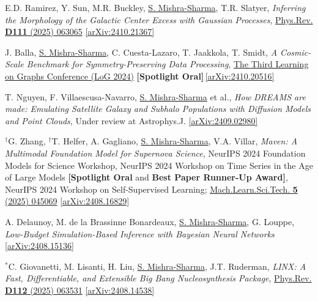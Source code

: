 \documentclass[letterpaper,11pt]{article}
\newenvironment{packed_enumerate}[1][]{
\begin{etaremune}[#1]
  \setlength{\itemsep}{4.0pt}
  \setlength{\parskip}{0pt}
  \setlength{\parsep}{0pt}}{\end{etaremune}
}
\begin{document}
\begin{packed_enumerate}[start=63]
\item E.D. Ramirez, Y. Sun, M.R. Buckley, \underline{S. Mishra-Sharma}, T.R. Slatyer, \emph{Inferring the Morphology of the Galactic Center Excess with Gaussian Processes}, \href{https://journals.aps.org/prd/abstract/10.1103/PhysRevD.111.063065}{Phys.Rev. \textbf{D111} (2025) 063065} \href{https://arxiv.org/abs/2410.21367}{[arXiv:2410.21367]}
\item J. Balla, \underline{S. Mishra-Sharma}, C. Cuesta-Lazaro, T. Jaakkola, T. Smidt, \emph{A Cosmic-Scale Benchmark for Symmetry-Preserving Data Processing}, \href{https://openreview.net/forum?id=t8yFkSAsLq}{The Third Learning on Graphs Conference (LoG 2024)}  {\textbf{[Spotlight Oral]}}\,\href{https://arxiv.org/abs/2410.20516}{[arXiv:2410.20516]}
\item T. Nguyen, F. Villaescusa-Navarro, \underline{S. Mishra-Sharma} et al., \emph{How DREAMS are made: Emulating Satellite Galaxy and Subhalo Populations with Diffusion Models and Point Clouds}, Under review at Astrophys.J. \href{https://arxiv.org/abs/2409.02980}{[arXiv:2409.02980]}
\item $^{\dagger}$G. Zhang, $^{\dagger}$T. Helfer, A. Gagliano, \underline{S. Mishra-Sharma}, V.A. Villar, \emph{Maven: A Multimodal Foundation Model for Supernova Science}, NeurIPS 2024 Foundation Models for Science Workshop, NeurIPS 2024 Workshop on Time Series in the Age of Large Models {\textbf{[Spotlight Oral} and \textbf{Best Paper Runner-Up Award]}}, NeurIPS 2024 Workshop on Self-Supervised Learning; \href{https://iopscience.iop.org/article/10.1088/2632-2153/ad990d}{Mach.Learn.Sci.Tech. \textbf{5} (2025) 045069} \href{https://arxiv.org/abs/2408.16829}{[arXiv:2408.16829]}
\item A. Delaunoy, M. de la Brassinne Bonardeaux, \underline{S. Mishra-Sharma}, G. Louppe, \emph{Low-Budget Simulation-Based Inference with Bayesian Neural Networks} \href{https://arxiv.org/abs/2408.15136}{[arXiv:2408.15136]}
\item $^*$C. Giovanetti, M. Lisanti, H. Liu, \underline{S. Mishra-Sharma}, J.T. Ruderman,
\emph{LINX: A Fast, Differentiable, and Extensible Big Bang Nucleosynthesis Package},
\href{https://journals.aps.org/prd/abstract/10.1103/f3tj-r882}{Phys.Rev. \textbf{D112} (2025) 063531}
\href{https://arxiv.org/abs/2408.14538}{[arXiv:2408.14538]}


\end{packed_enumerate}
\end{document}
